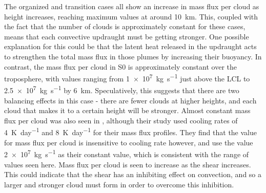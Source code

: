 \documentclass[11pt,a4paper]{article}
\begin{document}
The organized and transition cases all show an increase in mass flux per cloud as height increases, reaching maximum values at around \SI{10}{km}. This, coupled with the fact that the number of clouds is approximately constant for these cases, means that each convective updraught must be getting stronger. One possible explanation for this could be that the latent heat released in the updraught acts to strengthen the total mass flux in those plumes by increasing their buoyancy. In contrast, the mass flux per cloud in S0 is approximately constant over the troposphere, with values ranging from \SI{1e7}{kg.s^{-1}} just above the LCL to \SI{2.5e7}{kg.s^{-1}} by \SI{6}{km}. Speculatively, this suggests that there are two balancing effects in this case - there are fewer clouds at higher heights, and each cloud that makes it to a certain height will be stronger. Almost constant mass flux per cloud was also seen in \cite{PC2008}, although their study used cooling rates of \SI{4}{K.day^{-1}} and \SI{8}{K.day^{-1}} for their mass flux profiles. They find that the value for mass flux per cloud is insensitive to cooling rate however, and use the value \SI{2e7}{kg.s^{-1}} as their constant value, which is consistent with the range of values seen here. Mass flux per cloud is seen to increase as the shear increases. This could indicate that the shear has an inhibiting effect on convection, and so a larger and stronger cloud must form in order to overcome this inhibition.

\end{document}

